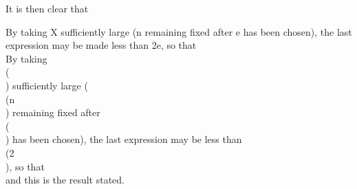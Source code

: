 It is then clear that

By taking X sufficiently large (n remaining fixed after e has been
chosen), the last expression may be made less than 2e, so that
\\[ \begin{align*}
  &
  \left| \, 
    \int_{a}^{b}\!
    \psi(\theta) \sin(\lambda \theta) \, d \theta
   \, \right| 
  \\
  & \quad
  =
  \left| \, 
    \sum_{r=1}^{n}
    \psi_{r}(x_{r-1})
    \int_{x_{r-1}}^{x_{r}}\!
    \sin (\lambda \theta) \, d \theta
    +
    \sum_{r=1}^{n}
    \int_{x_{r-1}}^{x_{r}}\!
    \omega_{r}(\theta) \sin(\lambda \theta) \, d \theta
   \, \right| 
  \\
  & \quad
  \leq
  \sum_{r=1}^{n}
  \left| \, 
    \psi_{r}(x_{r-1})
   \, \right| 
  \cdot
  \left| \, 
    \int_{x_{r-1}}^{x_{r}}\!
    \sin (\lambda \theta) \, d \theta
   \, \right| 
  +
  \sum_{r=1}^{n}
  \int_{x_{r-1}}^{x_{r}}\!
  \left| \,  \omega_{r} (\theta) \, \right|  \, d \theta
  \\
  & \quad
  \leq n K \cdot (2 / \lambda)
  +
  (S_{n} - s_{n})
  \\
  & \quad
  < (2nK / \lambda)
  +
  \eps.
\end{align*} \\]

By taking \\(\lambda\\) sufficiently large (\\(n\\) remaining fixed after \\(\eps\\) has been
chosen), the last expression may be less than \\(2\eps\\), so that
\\[ 
\lim_{\lambda \rightarrow \infty}
\int_{a}^{b}\! \psi(\theta) \sin(\lambda \theta) \, d \theta = 0,
\\] 
and this is the result stated.


